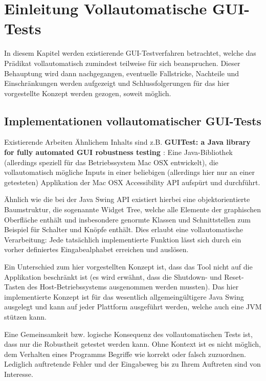\chapter{Einleitung Vollautomatische GUI-Tests}\label{chapter:introfullautoguitesting}


In diesem Kapitel werden existierende GUI-Testverfahren betrachtet, welche das Prädikat
\glqq{}vollautomatisch\grqq{} zumindest teilweise für sich beanspruchen. Dieser Behauptung wird
dann nachgegangen, eventuelle Fallstricke, Nachteile und Einschränkungen werden aufgezeigt
und Schlussfolgerungen für das hier vorgestellte Konzept werden gezogen, soweit möglich.


\section{Implementationen vollautomatischer GUI-Tests}\label{section:fullautoguitestsimpl}


Existierende Arbeiten Ähnlichem Inhalts sind z.B. \textbf{\glqq{}GUITest: a Java library for fully automated
GUI robustness testing\grqq{} \cite{GUITestBauersfeld}}: Eine Java-Bibliothek 
(allerdings speziell für das Betriebssystem Mac OSX entwickelt), die
vollautomatisch mögliche Inputs in einer beliebigen (allerdings hier nur an einer getesteten)
Applikation der \glqq{}Mac OSX Accessibility API\grqq{} aufspürt und durchführt.

Ähnlich wie die bei der Java Swing API existiert hierbei eine objektorientierte Baumstruktur,
die sogenannte \glqq{}Widget Tree\grqq{}, welche alle Elemente der graphischen Oberfläche enthält
und insbesondere genormte Klassen und Schnittstellen zum Beispiel für Schalter
und Knöpfe enthält. Dies erlaubt eine vollautomatische Verarbeitung:
Jede tatsächlich implementierte Funktion lässt sich durch ein vorher definiertes
\glqq{}Eingabealphabet\grqq{} erreichen und auslösen.

Ein Unterschied zum
hier vorgestellten Konzept ist, dass das Tool nicht auf die Applikation beschränkt ist (es wird
erwähnt, dass die Shutdown- und Reset-Tasten des Host-Betriebssystems ausgenommen werden
mussten). Das hier implementierte Konzept ist für das wesentlich allgemeingültigere Java Swing
ausgelegt und kann auf jeder Plattform ausgeführt werden, welche auch eine JVM stützen kann.

Eine Gemeinsamkeit bzw. logische Konsequenz des vollautomatischen Tests ist, dass nur
die Robustheit getestet werden kann. Ohne Kontext ist es nicht möglich, dem Verhalten eines
Programms Begriffe wie \glqq{}korrekt\grqq{} oder \glqq{}falsch\grqq{} zuzuordnen. Lediglich auftretende
Fehler und der Eingabeweg bis zu Ihrem Auftreten sind von Interesse.

